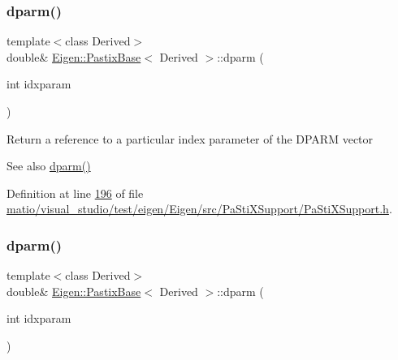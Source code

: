 \subsubsection{\texorpdfstring{dparm()}{dparm()}\hspace{0.1cm}{\footnotesize\ttfamily [3/4]}}
{\footnotesize\ttfamily template$<$class Derived$>$ \\
double\& \hyperlink{class_eigen_1_1_pastix_base}{Eigen\+::\+Pastix\+Base}$<$ Derived $>$\+::dparm (\begin{DoxyParamCaption}\item[{int}]{idxparam }\end{DoxyParamCaption})\hspace{0.3cm}{\ttfamily [inline]}}

Return a reference to a particular index parameter of the D\+P\+A\+RM vector \begin{DoxySeeAlso}{See also}
\hyperlink{class_eigen_1_1_pastix_base_af4a29373aa3e6a980738efde33f92a76}{dparm()} 
\end{DoxySeeAlso}


Definition at line \hyperlink{matio_2visual__studio_2test_2eigen_2_eigen_2src_2_pa_sti_x_support_2_pa_sti_x_support_8h_source_l00196}{196} of file \hyperlink{matio_2visual__studio_2test_2eigen_2_eigen_2src_2_pa_sti_x_support_2_pa_sti_x_support_8h_source}{matio/visual\+\_\+studio/test/eigen/\+Eigen/src/\+Pa\+Sti\+X\+Support/\+Pa\+Sti\+X\+Support.\+h}.

\mbox{\label{class_eigen_1_1_pastix_base_a6e7baecd4990d6df9b5713cb6499e940}} 
\subsubsection{\texorpdfstring{dparm()}{dparm()}\hspace{0.1cm}{\footnotesize\ttfamily [4/4]}}
{\footnotesize\ttfamily template$<$class Derived$>$ \\
double\& \hyperlink{class_eigen_1_1_pastix_base}{Eigen\+::\+Pastix\+Base}$<$ Derived $>$\+::dparm (\begin{DoxyParamCaption}\item[{int}]{idxparam }\end{DoxyParamCaption})\hspace{0.3cm}{\ttfamily [inline]}}

